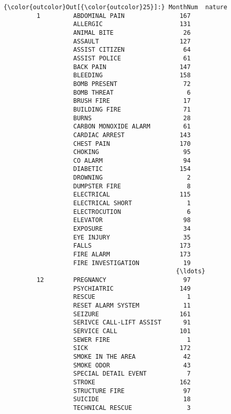 \documentclass[11pt]{article}
\begin{document}
\begin{Verbatim}[commandchars=\\\{\}]
{\color{outcolor}Out[{\color{outcolor}25}]:} MonthNum  nature                   
         1         ABDOMINAL PAIN               167
                   ALLERGIC                     131
                   ANIMAL BITE                   26
                   ASSAULT                      127
                   ASSIST CITIZEN                64
                   ASSIST POLICE                 61
                   BACK PAIN                    147
                   BLEEDING                     158
                   BOMB PRESENT                  72
                   BOMB THREAT                    6
                   BRUSH FIRE                    17
                   BUILDING FIRE                 71
                   BURNS                         28
                   CARBON MONOXIDE ALARM         61
                   CARDIAC ARREST               143
                   CHEST PAIN                   170
                   CHOKING                       95
                   CO ALARM                      94
                   DIABETIC                     154
                   DROWNING                       2
                   DUMPSTER FIRE                  8
                   ELECTRICAL                   115
                   ELECTRICAL SHORT               1
                   ELECTROCUTION                  6
                   ELEVATOR                      98
                   EXPOSURE                      34
                   EYE INJURY                    35
                   FALLS                        173
                   FIRE ALARM                   173
                   FIRE INVESTIGATION            19
                                               {\ldots} 
         12        PREGNANCY                     97
                   PSYCHIATRIC                  149
                   RESCUE                         1
                   RESET ALARM SYSTEM            11
                   SEIZURE                      161
                   SERIVCE CALL-LIFT ASSIST      91
                   SERVICE CALL                 101
                   SEWER FIRE                     1
                   SICK                         172
                   SMOKE IN THE AREA             42
                   SMOKE ODOR                    43
                   SPECIAL DETAIL EVENT           7
                   STROKE                       162
                   STRUCTURE FIRE                97
                   SUICIDE                       18
                   TECHNICAL RESCUE               3

\end{Verbatim}
\end{document}
